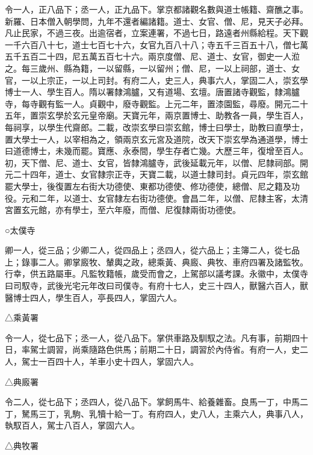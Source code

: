 \begin{pinyinscope}
 令一人，正八品下；丞一人，正九品下。掌京都諸觀名數與道士帳籍、齋醮之事。新羅、日本僧入朝學問，九年不還者編諸籍。道士、女官、僧、尼，見天子必拜。凡止民家，不過三夜。出逾宿者，立案連署，不過七日，路遠者州縣給程。天下觀一千六百八十七，道士七百七十六，女官九百八十八；寺五千三百五十八，僧七萬五千五百二十四，尼五萬五百七十六。兩京度僧、尼、道士、女官，御史一人涖之。每三歲州、縣為籍，一以留縣，一以留州；僧、尼，一以上祠部，道士、女官，一以上宗正，一以上司封。有府二人，史三人，典事六人，掌固二人，崇玄學博士一人、學生百人。隋以署隸鴻臚，又有道場、玄壇。唐置諸寺觀監，隸鴻臚寺，每寺觀有監一人。貞觀中，廢寺觀監。上元二年，置漆園監，尋廢。開元二十五年，置崇玄學於玄元皇帝廟。天寶元年，兩京置博士、助教各一員，學生百人，每祠享，以學生代齋郎。二載，改崇玄學曰崇玄館，博士曰學士，助教曰直學士，置大學士一人，以宰相為之，領兩京玄元宮及道院，改天下崇玄學為通道學，博士曰道德博士，未幾而罷。寶應、永泰間，學生存者亡幾。大歷三年，復增至百人。初，天下僧、尼、道士、女官，皆隸鴻臚寺，武後延載元年，以僧、尼隸祠部。開元二十四年，道士、女官隸宗正寺，天寶二載，以道士隸司封。貞元四年，崇玄館罷大學士，後復置左右街大功德使、東都功德使、修功德使，總僧、尼之籍及功役。元和二年，以道士、女官隸左右街功德使。會昌二年，以僧、尼隸主客，太清宮置玄元館，亦有學士，至六年廢，而僧、尼復隸兩街功德使。



 ○太僕寺



 卿一人，從三品；少卿二人，從四品上；丞四人，從六品上；主簿二人，從七品上；錄事二人。卿掌廄牧、輦輿之政，總乘黃、典廄、典牧、車府四署及諸監牧。行幸，供五路屬車。凡監牧籍帳，歲受而會之，上駕部以議考課。永徽中，太僕寺曰司馭寺，武後光宅元年改曰司僕寺。有府十七人，史三十四人，獸醫六百人，獸醫博士四人，學生百人，亭長四人，掌固六人。



 △乘黃署



 令一人，從七品下；丞一人，從八品下。掌供車路及馴馭之法。凡有事，前期四十日，率駕士調習，尚乘隨路色供馬；前期二十日，調習於內侍省。有府一人，史二人，駕士一百四十人，羊車小史十四人，掌固六人。



 △典廄署



 令二人，從七品下；丞四人，從八品下。掌飼馬牛、給養雜畜。良馬一丁，中馬二丁，駑馬三丁，乳駒、乳犢十給一丁。有府四人，史八人，主乘六人，典事八人，執馭百人，駕士八百人，掌固六人。



 △典牧署




\end{pinyinscope}
